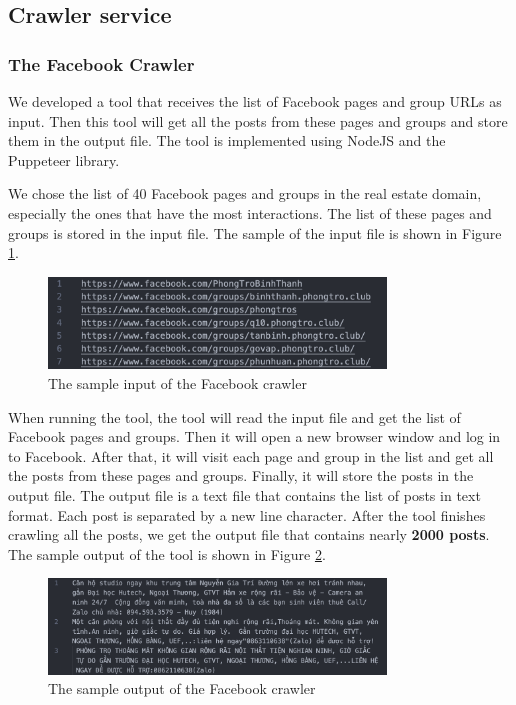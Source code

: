 \clearpage

\subsection{Crawler service}

\subsubsection{The Facebook Crawler}
We developed a tool that receives the list of Facebook pages and group URLs as input. Then this tool will get all the posts from these pages and groups and store them in the output file. The tool is implemented using NodeJS and the Puppeteer library.

We chose the list of 40 Facebook pages and groups in the real estate domain, especially the ones that have the most interactions. The list of these pages and groups is stored in the input file. The sample of the input file is shown in Figure \ref{fig:facebook-crawler-input}.

\begin{figure}[ht]
    \centering
    \includegraphics[width=0.8\textwidth]{Images/9.Implementation/facebook_crawler_input.png}
    \caption{The sample input of the Facebook crawler}
    \label{fig:facebook-crawler-input}
\end{figure}

When running the tool, the tool will read the input file and get the list of Facebook pages and groups. Then it will open a new browser window and log in to Facebook. After that, it will visit each page and group in the list and get all the posts from these pages and groups. Finally, it will store the posts in the output file. The output file is a text file that contains the list of posts in text format. Each post is separated by a new line character. After the tool finishes crawling all the posts, we get the output file that contains nearly \textbf{2000 posts}. The sample output of the tool is shown in Figure \ref{fig:facebook-crawler}.

\begin{figure}[ht]
    \centering
    \includegraphics[width=0.8\textwidth]{Images/9.Implementation/facebook_crawler_output.png}
    \caption{The sample output of the Facebook crawler}
    \label{fig:facebook-crawler}
\end{figure}

